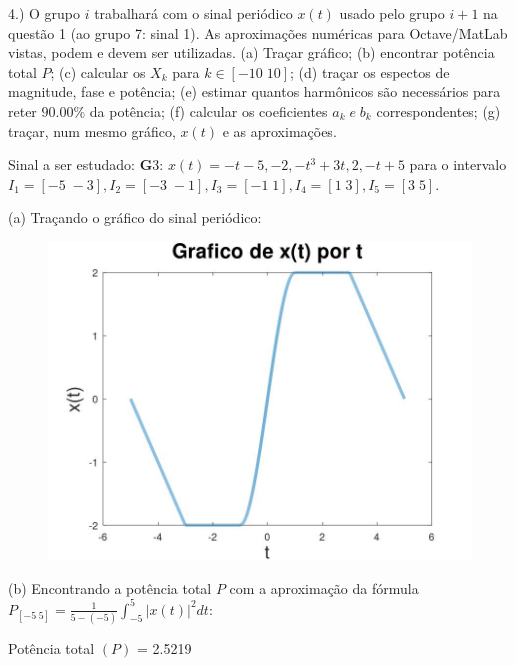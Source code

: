 \documentclass{article}
\begin{document}
\vspace{\baselineskip}

4.) O grupo $i$ trabalhará com o sinal periódico $x(t)$ usado pelo grupo $i + 1$ na questão 1 (ao grupo 7: sinal 1). As aproximações numéricas para Octave/MatLab vistas, podem e devem ser utilizadas.
(a) Traçar gráfico;
(b) encontrar potência total $P$;
(c) calcular os $X_{k}$ para $k \in [-10\;10]$;
(d) traçar os espectos de magnitude, fase e potência;
(e) estimar quantos harmônicos são necessários para reter $90.00\%$ da potência;
(f) calcular os coeficientes $a_{k}\;e\;b_{k}$ correspondentes;
(g) traçar, num mesmo gráfico, $x(t)$ e as aproximações.

Sinal a ser estudado: {\textbf G3}: $x(t) = -t - 5, -2, -t^3 + 3t, 2, -t + 5$ para o intervalo $I_{1} = [-5\;-3], I_{2} = [-3\;-1], I_{3} = [-1\;1], I_{4} = [1\;3], I_{5} = [3\;5]$.

\newpage

(a) Traçando o gráfico do sinal periódico:

\begin{figure}[!ht]
    \includegraphics[scale=0.3]{plot4a}
    \centering
\end{figure}

\vspace{\baselineskip}

(b) Encontrando a potência total $P$ com a aproximação da fórmula $P_{[-5\;5]} = \frac{1}{5 - (-5)} \int_{-5}^{5} |x(t)|^2 dt $:

\vspace{\baselineskip}

Potência total $(P)$ = 2.5219
\end{document}
